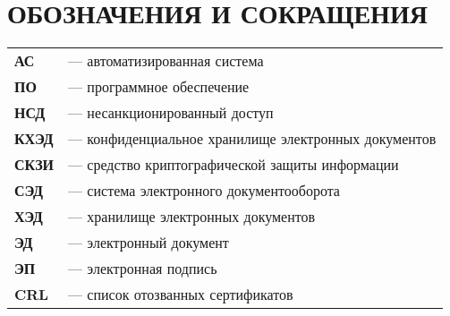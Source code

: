 \chapter*{ОБОЗНАЧЕНИЯ И СОКРАЩЕНИЯ}
\begin{tabular}{ll}

\textbf{АС} & --- автоматизированная система \\
\textbf{ПО} & --- программное обеспечение \\
\textbf{НСД} & --- несанкционированный доступ \\
\textbf{КХЭД} & --- конфиденциальное хранилище электронных документов \\
\textbf{СКЗИ} & --- средство криптографической защиты информации \\
\textbf{СЭД} & --- система электронного документооборота \\
\textbf{ХЭД} & --- хранилище электронных документов \\
\textbf{ЭД} & --- электронный документ \\
\textbf{ЭП} & --- электронная подпись \\
\textbf{CRL} & --- список отозванных сертификатов  \\
\end{tabular}
\clearpage